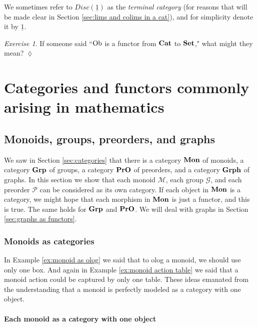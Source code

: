 \documentclass{book}
\def\tn{\textnormal}
\def\mc{\mathcal}
\def\Ob{\tn{Ob}}
\def\to{\rightarrow}
\def\taking{\colon}
\def\ul{\underline}
\def\Cat{{\bf Cat}}
\def\Mon{{\bf Mon}}
\def\Grp{{\bf Grp}}
\def\Grph{{\bf Grph}}
\def\Set{{\bf Set}}
\def\PrO{{\bf PrO}}
\def\mcG{\mc{G}}
\def\mcM{\mc{M}}
\def\mcP{\mc{P}}
\theoremstyle{remark}
\newtheorem{exc}[subsubsection]{Exercise}
\newenvironment{exercise}{\begin{exc}}{\hspace*{\fill}$\lozenge$\end{exc}}
\theoremstyle{definition}
\begin{document}
We sometimes refer to $Disc(\ul{1})$ as the {\em terminal category} (for reasons that will be made clear in Section \ref{sec:lims and colims in a cat}), and for simplicity denote it by $\ul{1}$.

\begin{exercise}\label{exc:Ob is a functor}
If someone said ``$\Ob$ is a functor from $\Cat$ to $\Set$," what might they mean? \index{a functor!$\Ob\taking\Cat\to\Set$}
\end{exercise}


\section{Categories and functors commonly arising in mathematics}



\subsection{Monoids, groups, preorders, and graphs}\label{sec:mon grp pro as cat}

We saw in Section \ref{sec:categories} that there is a category $\Mon$ of monoids, a category $\Grp$ of groups, a category $\PrO$ of preorders, and a category $\Grph$ of graphs. In this section we show that each monoid $\mcM$, each group $\mcG$, and each preorder $\mcP$ can be considered as its own category. If each object in $\Mon$ is a category, we might hope that each morphism in $\Mon$ is just a functor, and this is true. The same holds for $\Grp$ and $\PrO$. We will deal with graphs in Section \ref{sec:graphs as functors}.


\subsubsection{Monoids as categories}\label{sec:monoids as cats}

In Example \ref{ex:monoid as olog} we said that to olog a monoid, we should use only one box. And again in Example \ref{ex:monoid action table} we said that a monoid action could be captured by only one table. These ideas emanated from the understanding that a monoid is perfectly modeled as a category with one object. 

\paragraph{Each monoid as a category with one object}
\end{document}

